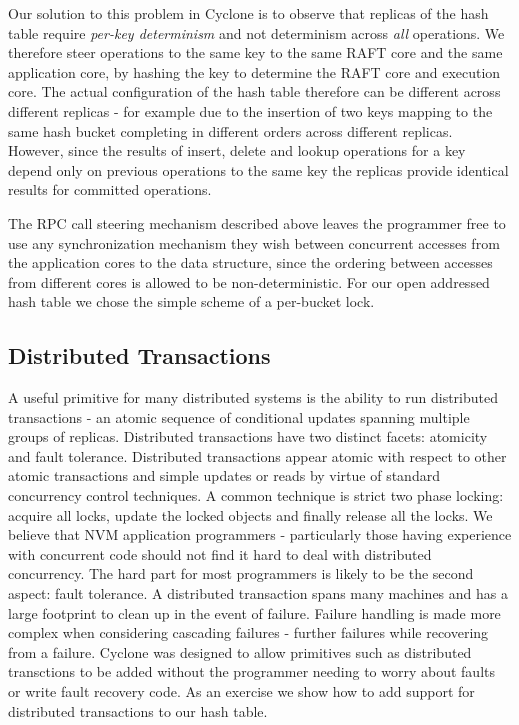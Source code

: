 \documentclass[letterpaper,twocolumn,10pt]{article}
\begin{document}
Our solution to this problem in Cyclone is to observe that replicas of the hash
table require \emph{per-key determinism} and not determinism across \emph{all}
operations. We therefore steer operations to the same key to the same RAFT core
and the same application core, by hashing the key to determine the RAFT core and
execution core. The actual configuration of the hash table therefore can be
different across different replicas - for example due to the insertion of two
keys mapping to the same hash bucket completing in different orders across
different replicas. However, since the results of insert, delete and lookup
operations for a key depend only on previous operations to the same key the
replicas provide identical results for committed operations.

The RPC call steering mechanism described above leaves the programmer free to
use any synchronization mechanism they wish between concurrent accesses from the
application cores to the data structure, since the ordering between accesses
from different cores is allowed to be non-deterministic. For our open addressed
hash table we chose the simple scheme of a per-bucket lock.

\subsection{Distributed Transactions}
A useful primitive for many distributed systems is the ability to run
distributed transactions - an atomic sequence of conditional updates spanning
multiple groups of replicas. Distributed transactions have two distinct facets:
atomicity and fault tolerance. Distributed transactions appear atomic with
respect to other atomic transactions and simple updates or reads by virtue of
standard concurrency control techniques. A common technique is strict two phase
locking: acquire all locks, update the locked objects and finally release all
the locks. We believe that NVM application programmers - particularly those
having experience with concurrent code should not find it hard to deal with
distributed concurrency. The hard part for most programmers is likely to be the
second aspect: fault tolerance. A distributed transaction spans many machines
and has a large footprint to clean up in the event of failure. Failure handling
is made more complex when considering cascading failures - further failures
while recovering from a failure. Cyclone was designed to allow primitives such
as distributed transctions to be added without the programmer needing to worry
about faults or write fault recovery code. As an exercise we show how to add
support for distributed transactions to our hash table.
\end{document}
